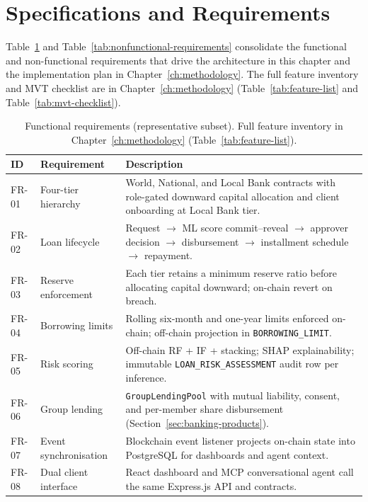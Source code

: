 \documentclass[12pt,a4paper]{report}
\newcommand{\tableheadcolor}{\rowcolor{TableHeadBg}}
\begin{document}
\section{Specifications and Requirements}
\label{sec:specifications-requirements}

Table~\ref{tab:functional-requirements} and Table~\ref{tab:nonfunctional-requirements} consolidate the functional and non-functional requirements that drive the architecture in this chapter and the implementation plan in Chapter~\ref{ch:methodology}. The full feature inventory and MVT checklist are in Chapter~\ref{ch:methodology} (Table~\ref{tab:feature-list} and Table~\ref{tab:mvt-checklist}).

\begin{table}[H]
\centering
\caption[Functional requirements (representative)]{Functional requirements (representative subset). Full feature inventory in Chapter~\ref{ch:methodology} (Table~\ref{tab:feature-list}).}
\label{tab:functional-requirements}
\small
\begin{tabular}{@{}p{1.2cm}p{4.2cm}p{8.8cm}@{}}
\toprule
\tableheadcolor
\textbf{ID} & \textbf{Requirement} & \textbf{Description} \\
\midrule
FR-01 & Four-tier hierarchy & World, National, and Local Bank contracts with role-gated downward capital allocation and client onboarding at Local Bank tier. \\
FR-02 & Loan lifecycle & Request $\to$ ML score commit--reveal $\to$ approver decision $\to$ disbursement $\to$ installment schedule $\to$ repayment. \\
FR-03 & Reserve enforcement & Each tier retains a minimum reserve ratio before allocating capital downward; on-chain revert on breach. \\
FR-04 & Borrowing limits & Rolling six-month and one-year limits enforced on-chain; off-chain projection in \texttt{BORROWING\_LIMIT}. \\
FR-05 & Risk scoring & Off-chain RF + IF + stacking; SHAP explainability; immutable \texttt{LOAN\_RISK\_ASSESSMENT} audit row per inference. \\
FR-06 & Group lending & \texttt{GroupLendingPool} with mutual liability, consent, and per-member share disbursement (Section~\ref{sec:banking-products}). \\
FR-07 & Event synchronisation & Blockchain event listener projects on-chain state into PostgreSQL for dashboards and agent context. \\
FR-08 & Dual client interface & React dashboard and MCP conversational agent call the same Express.js API and contracts. \\
\bottomrule
\end{tabular}
\end{table}
\end{document}
